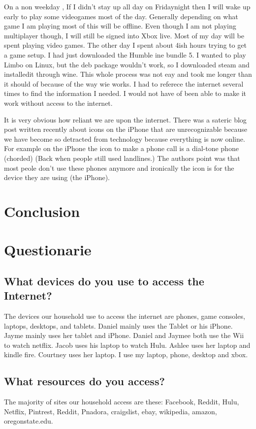 \documentclass[12pt,letterpaper]{article}
\begin{document}
On a non weekday , If I didn't stay up all day on Fridaynight then I
will wake up early to play some videogames most of the day. Generally
depending on what game I am playing most of this will be offline. Even
though I am not playing multiplayer though, I will still be signed into
Xbox live. Most of my day will be spent playing video games. The other
day I spent about 4ish hours trying to get a game setup. I had just
downloaded the Humble ine bundle 5. I wanted to play Limbo on Linux, but
the deb package wouldn't work, so I downloaded steam and installedit
through wine. This whole process was not eay and took me longer than it
should of because of the way wie works. I had to referece the internet
several times to find the information I needed. I would not have of been
able to make it work without access to the internet.

It is very obvious how reliant we are upon the internet. There was a
sateric blog post written recently about icons on the iPhone that are
unrecognizable because we have become so detracted from technology
because everything is now online. For example on the iPhone the icon to
make a phone call is a dial-tone phone (chorded) (Back when people still
used landlines.)  The authors point was that most peole don't use these
phones anymore and ironically the icon is for the device they are using
(the iPhone).


\section{Conclusion}

\section{Questionarie}
\subsection{What devices do you use to access the Internet?}
The devices our household use to access the internet are phones, game
consoles, laptops, desktops, and tablets. Daniel mainly uses the Tablet
or his iPhone. Jayme mainly uses her tablet and iPhone. Daniel and
Jaymee both use the Wii to watch netflix. Jacob uses his
laptop to watch Hulu. Ashlee uses her laptop and kindle fire. Courtney uses her
laptop. I use my laptop, phone, desktop and xbox.

\subsection{What resources do you access?}
The majority of sites our household access are these:
Facebook, Reddit, Hulu, Netflix, Pintrest, Reddit, Pnadora, craigslist,
ebay, wikipedia, amazon, oregonstate.edu.
\end{document}
